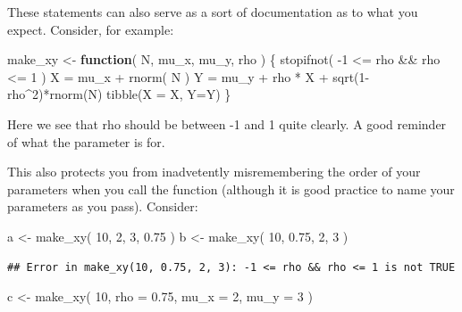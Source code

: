 \documentclass[
]{book}
\newenvironment{Shaded}{\begin{snugshade}}{\end{snugshade}}
\newcommand{\AttributeTok}[1]{\textcolor[rgb]{0.77,0.63,0.00}{#1}}
\newcommand{\ControlFlowTok}[1]{\textcolor[rgb]{0.13,0.29,0.53}{\textbf{#1}}}
\newcommand{\DecValTok}[1]{\textcolor[rgb]{0.00,0.00,0.81}{#1}}
\newcommand{\FloatTok}[1]{\textcolor[rgb]{0.00,0.00,0.81}{#1}}
\newcommand{\FunctionTok}[1]{\textcolor[rgb]{0.00,0.00,0.00}{#1}}
\newcommand{\NormalTok}[1]{#1}
\newcommand{\OtherTok}[1]{\textcolor[rgb]{0.56,0.35,0.01}{#1}}
\newcommand{\SpecialCharTok}[1]{\textcolor[rgb]{0.00,0.00,0.00}{#1}}
\begin{document}
These statements can also serve as a sort of documentation as to what you expect.
Consider, for example:

\begin{Shaded}
\begin{Highlighting}[]
\NormalTok{make\_xy }\OtherTok{\textless{}{-}} \ControlFlowTok{function}\NormalTok{( N, mu\_x, mu\_y, rho ) \{}
  \FunctionTok{stopifnot}\NormalTok{( }\SpecialCharTok{{-}}\DecValTok{1} \SpecialCharTok{\textless{}=}\NormalTok{ rho }\SpecialCharTok{\&\&}\NormalTok{ rho }\SpecialCharTok{\textless{}=} \DecValTok{1}\NormalTok{ )}
\NormalTok{  X }\OtherTok{=}\NormalTok{ mu\_x }\SpecialCharTok{+} \FunctionTok{rnorm}\NormalTok{( N )}
\NormalTok{  Y }\OtherTok{=}\NormalTok{ mu\_y }\SpecialCharTok{+}\NormalTok{ rho }\SpecialCharTok{*}\NormalTok{ X }\SpecialCharTok{+} \FunctionTok{sqrt}\NormalTok{(}\DecValTok{1}\SpecialCharTok{{-}}\NormalTok{rho}\SpecialCharTok{\^{}}\DecValTok{2}\NormalTok{)}\SpecialCharTok{*}\FunctionTok{rnorm}\NormalTok{(N)}
  \FunctionTok{tibble}\NormalTok{(}\AttributeTok{X =}\NormalTok{ X, }\AttributeTok{Y=}\NormalTok{Y)}
\NormalTok{\}}
\end{Highlighting}
\end{Shaded}

Here we see that rho should be between -1 and 1 quite clearly.
A good reminder of what the parameter is for.

This also protects you from inadvetently misremembering the order of your parameters when you call the function (although it is good practice to name your parameters as you pass).
Consider:

\begin{Shaded}
\begin{Highlighting}[]
\NormalTok{a }\OtherTok{\textless{}{-}} \FunctionTok{make\_xy}\NormalTok{( }\DecValTok{10}\NormalTok{, }\DecValTok{2}\NormalTok{, }\DecValTok{3}\NormalTok{, }\FloatTok{0.75}\NormalTok{ )}
\NormalTok{b }\OtherTok{\textless{}{-}} \FunctionTok{make\_xy}\NormalTok{( }\DecValTok{10}\NormalTok{, }\FloatTok{0.75}\NormalTok{, }\DecValTok{2}\NormalTok{, }\DecValTok{3}\NormalTok{ )}
\end{Highlighting}
\end{Shaded}

\begin{verbatim}
## Error in make_xy(10, 0.75, 2, 3): -1 <= rho && rho <= 1 is not TRUE
\end{verbatim}

\begin{Shaded}
\begin{Highlighting}[]
\NormalTok{c }\OtherTok{\textless{}{-}} \FunctionTok{make\_xy}\NormalTok{( }\DecValTok{10}\NormalTok{, }\AttributeTok{rho =} \FloatTok{0.75}\NormalTok{, }\AttributeTok{mu\_x =} \DecValTok{2}\NormalTok{, }\AttributeTok{mu\_y =} \DecValTok{3}\NormalTok{ )}
\end{Highlighting}
\end{Shaded}
\end{document}
